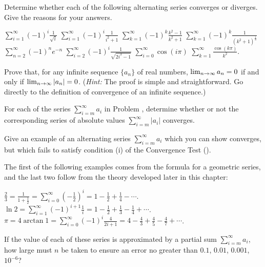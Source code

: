 \begin{exercises}

Determine whether each of the following
alternating series converges or diverges.
Give the reasons for your answers.
\begin{exenum}
\x
$\sum_{i=1}^\infty (-1)^i \frac{1}{\sqrt{i}}$
\x
$\sum_{i=1}^\infty (-1)^i \frac{1}{i^2+1}$
\x
$\sum_{k=1}^\infty (-1)^k \frac{k^2-1}{k^2+1}$
\x
$\sum_{k=1}^\infty (-1)^k \frac{1}{(k^2+1)^{\frac13}}$
\x
$\sum_{n=2}^\infty (-1)^n e^{-n}$
\x
$\sum_{i=2}^\infty (-1)^i \frac{1}{\sqrt{2i^3-1}}$
\x
$\sum_{i=0}^\infty \cos(i\pi)$
\x
$\sum_{k=1}^\infty \frac{\cos(k\pi)}{k^2}$.
\end{exenum}

Prove that, for any infinite sequence
$\{ a_n \}$ of real numbers,
$\lim_{n\rightarrow\infty} a_n = 0$ if and only if
$\lim_{n\rightarrow\infty} |a_n| = 0$.
(\emph{Hint:} The proof is simple and straightforward.
Go directly to the definition of convergence
of an infinite sequence.)

For each of the series
$\sum_{i=m}^\infty a_i$ in Problem ,
determine whether or not the corresponding
series of absolute values
$\sum_{i=m}^\infty |a_i|$ converges.

Give an example of an alternating series
$\sum_{i=m}^\infty a_i$ which you can show
converges, but which fails to satisfy condition (i)
of the Convergence Test ().

The first of the following examples comes from
the formula for a geometric series,
and the last two follow from the theory
developed later in this chapter:
\begin{exenum}
\x
$\frac23 = \frac1{1+\frac12} =
\sum_{i=0}^\infty (-\frac12)^i =
1 - \frac12 + \frac14 - \cdots$.
\x
$\ln 2 = \sum_{i=1}^\infty (-1)^{i+1} \frac1i =
1 - \frac12 + \frac13 - \frac14 + \cdots$.
\x
$\pi = 4 \arctan 1 =
\sum_{i=0}^\infty (-1)^i \frac4{2i+1}=
4 - \frac43 + \frac45 - \frac47 + \cdots$.
\end{exenum}
If the value of each of these series is approximated
by a partial sum $\sum_{i=m}^\infty a_i$,
how large must $n$ be taken to ensure an error
no greater than $0.1$, $0.01$, $0.001$, $10^{-6}$?

\end{exercises}
